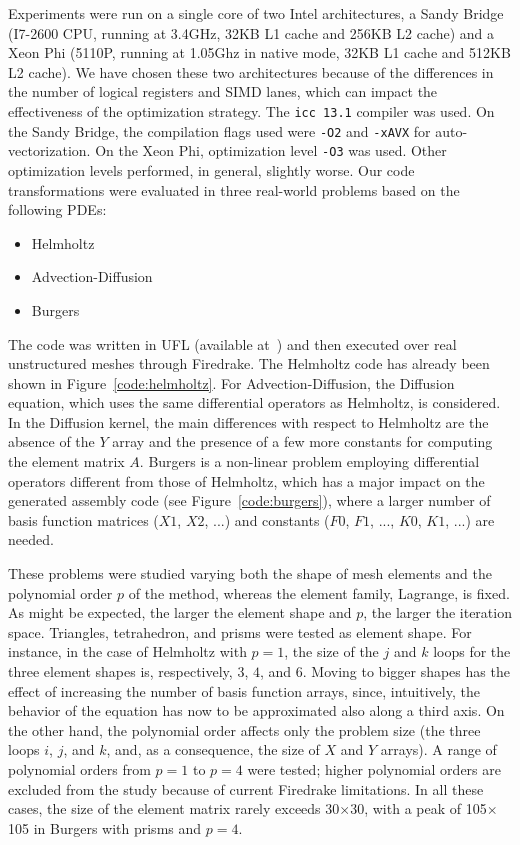 \documentclass[conference]{IEEEtran}
\begin{document}
Experiments were run on a single core of two Intel architectures, a Sandy Bridge (I7-2600 CPU, running at 3.4GHz, 32KB L1 cache and 256KB L2 cache) and a Xeon Phi (5110P, running at 1.05Ghz in native mode, 32KB L1 cache and 512KB L2 cache). We have chosen these two architectures because of the differences in the number of logical registers and SIMD lanes, which can impact the effectiveness of the optimization strategy. The \texttt{icc 13.1} compiler was used. On the Sandy Bridge, the compilation flags used were \texttt{-O2} and \texttt{-xAVX} for auto-vectorization. On the Xeon Phi, optimization level \texttt{-O3} was used. Other optimization levels performed, in general, slightly worse. Our code transformations were evaluated in three real-world problems based on the following PDEs:
\begin{itemize}
\item Helmholtz
\item Advection-Diffusion
\item Burgers
\end{itemize}
The code was written in UFL (available at~\cite{ufl-code}) and then executed over real unstructured meshes through Firedrake. The Helmholtz code has already been shown in Figure~\ref{code:helmholtz}. For Advection-Diffusion, the Diffusion equation, which uses the same differential operators as Helmholtz, is considered. In the Diffusion kernel, the main differences with respect to Helmholtz are the absence of the $Y$ array and the presence of a few more constants for computing the element matrix $A$. Burgers is a non-linear problem employing differential operators different from those of Helmholtz, which has a major impact on the generated assembly code (see Figure~\ref{code:burgers}), where a larger number of basis function matrices ($X1$, $X2$, ...) and constants ($F0$, $F1$, ..., $K0$, $K1$, ...) are needed. 

These problems were studied varying both the shape of mesh elements and the polynomial order $p$ of the method, whereas the element family, Lagrange, is fixed. As might be expected, the larger the element shape and $p$, the larger the iteration space. Triangles, tetrahedron, and prisms were tested as element shape. For instance, in the case of Helmholtz with $p=1$, the size of the $j$ and $k$ loops for the three element shapes is, respectively, $3$, $4$, and $6$. Moving to bigger shapes has the effect of increasing the number of basis function arrays, since, intuitively, the behavior of the equation has now to be approximated also along a third axis. On the other hand, the polynomial order affects only the problem size (the three loops $i$, $j$, and $k$, and, as a consequence, the size of $X$ and $Y$ arrays). A range of polynomial orders from $p=1$ to $p=4$ were tested; higher polynomial orders are excluded from the study because of current Firedrake limitations. In all these cases, the size of the element matrix rarely exceeds 30$\times$30, with a peak of 105$\times$105 in Burgers with prisms and $p=4$.
\end{document}
